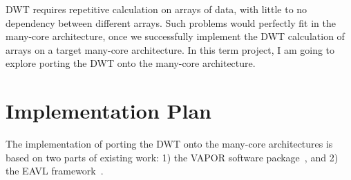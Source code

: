 \documentclass{article}
\begin{document}
DWT requires repetitive calculation on arrays of data, with little to no
dependency between different arrays.
%
Such problems would perfectly fit in the many-core architecture, once we
successfully implement the DWT calculation of arrays on a target many-core
architecture.
%
In this term project, I am going to explore porting the DWT onto the 
many-core architecture.


\section{Implementation Plan}
The implementation of porting the DWT onto the many-core architectures
is based on two parts of existing work: 1) the VAPOR software 
package~\cite{clyne2007interactive},
and 2) the EAVL framework~\cite{meredith2012distributed}.






\end{document}
